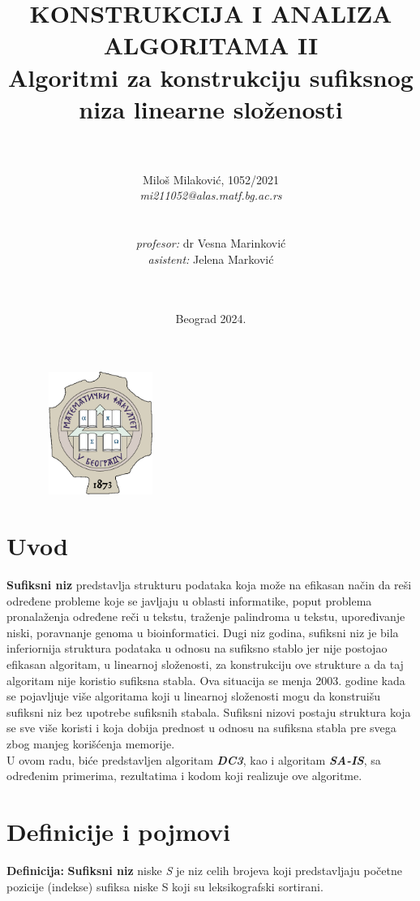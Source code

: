 \documentclass[serbian]{article}
\title{\textbf{KONSTRUKCIJA I ANALIZA ALGORITAMA II} \\
\vspace{25}
\Large{\textbf{Algoritmi za konstrukciju sufiksnog niza linearne složenosti}}}
\author{ \\\\Miloš Milaković, 1052/2021 \\ \textit{mi211052@alas.matf.bg.ac.rs} \\\\\\
        \textit{profesor:} dr Vesna Marinković \\
        \textit{asistent:} Jelena Marković \\\\\\}
\date{Beograd 2024.}
\begin{document}
\maketitle
\thispagestyle{empty} 

\vspace{17}
\begin{figure}[h!]
    \centering
    \includegraphics[width=4cm, height=4cm]{grb.png}
\end{figure} 

\newpage
\tableofcontents

\newpage
\section{Uvod}
\textbf{Sufiksni niz} predstavlja strukturu podataka koja može na efikasan način da reši određene probleme koje se javljaju u oblasti informatike, poput problema pronalaženja određene reči u tekstu, traženje palindroma u tekstu, upoređivanje niski, poravnanje genoma u bioinformatici. Dugi niz godina, sufiksni niz je bila inferiornija struktura podataka u odnosu na sufiksno stablo jer nije postojao efikasan algoritam, u linearnoj složenosti, za konstrukciju ove strukture a da taj algoritam nije koristio sufiksna stabla. Ova situacija se menja 2003. godine kada se pojavljuje više algoritama koji u linearnoj složenosti mogu da konstruišu sufiksni niz bez upotrebe sufiksnih stabala. Sufiksni nizovi postaju struktura koja se sve više koristi i koja dobija prednost u odnosu na sufiksna stabla pre svega zbog manjeg korišćenja memorije.\\

U ovom radu, biće predstavljen algoritam \textit{\textbf{DC3}}, kao i algoritam \textit{\textbf{SA-IS}}, sa određenim primerima, rezultatima i kodom koji realizuje ove algoritme.

\section{Definicije i pojmovi}
\textbf{Definicija:} \textbf{Sufiksni niz} niske \textit{S} je niz celih brojeva koji predstavljaju početne pozicije (indekse) sufiksa niske S koji su leksikografski sortirani.\\
\end{document}
